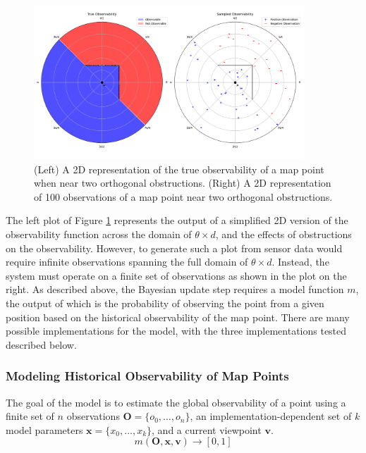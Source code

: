 \begin{figure}[!ht]
    \centering
    \includegraphics[width=0.9\textwidth]{resources/2d_observability.png}
    \caption[2D Observability]{(Left) A 2D representation of the true observability of a map point when near two orthogonal obstructions. (Right) A 2D representation of 100 observations of a map point near two orthogonal obstructions.}
    \label{fig:2d_observability}
\end{figure}

The left plot of Figure \ref{fig:2d_observability} represents the output of a simplified 2D version of the observability function across the domain of $\theta\times d$, and the effects of obstructions on the observability. However, to generate such a plot from sensor data would require infinite observations spanning the full domain of $\theta\times d$. Instead, the system must operate on a finite set of observations as shown in the plot on the right. As described above, the Bayesian update step requires a model function $m$, the output of which is the probability of observing the point from a given position based on the historical observability of the map point. There are many possible implementations for the model, with the three implementations tested described below.

\subsubsection{Modeling Historical Observability of Map Points}

The goal of the model is to estimate the global observability of a point using a finite set of $n$ observations $\boldsymbol{O} = \{o_0,\dots,o_n\}$, an implementation-dependent set of $k$ model parameters $\boldsymbol{x}=\{x_0,\dots,x_k\}$, and a current viewpoint $\boldsymbol{v}$.
$$
    m(\boldsymbol{O},\boldsymbol{x},\boldsymbol{v})\to[0,1]
$$

